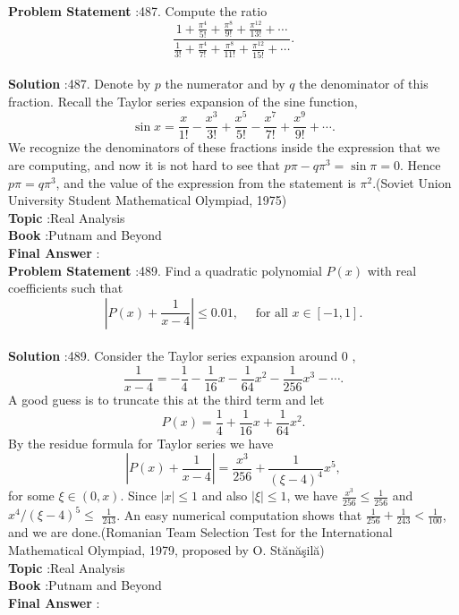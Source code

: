 \documentclass[10pt]{article}
\begin{document}
\textbf{Problem Statement} :487. Compute the ratio$$ \frac{1+\frac{\pi^{4}}{5 !}+\frac{\pi^{8}}{9 !}+\frac{\pi^{12}}{13 !}+\cdots}{\frac{1}{3 !}+\frac{\pi^{4}}{7 !}+\frac{\pi^{8}}{11 !}+\frac{\pi^{12}}{15 !}+\cdots} . $$\\
\textbf{Solution} :487. Denote by $p$ the numerator and by $q$ the denominator of this fraction. Recall the Taylor series expansion of the sine function,$$ \sin x=\frac{x}{1 !}-\frac{x^{3}}{3 !}+\frac{x^{5}}{5 !}-\frac{x^{7}}{7 !}+\frac{x^{9}}{9 !}+\cdots . $$We recognize the denominators of these fractions inside the expression that we are computing, and now it is not hard to see that $p \pi-q \pi^{3}=\sin \pi=0$. Hence $p \pi=q \pi^{3}$, and the value of the expression from the statement is $\pi^{2}$.(Soviet Union University Student Mathematical Olympiad, 1975) \\
\textbf{Topic} :Real Analysis\\
\textbf{Book} :Putnam and Beyond\\
\textbf{Final Answer} :\\


\textbf{Problem Statement} :489. Find a quadratic polynomial $P(x)$ with real coefficients such that$$ \left|P(x)+\frac{1}{x-4}\right| \leq 0.01, \quad \text { for all } x \in[-1,1] . $$\\
\textbf{Solution} :489. Consider the Taylor series expansion around 0 ,$$ \frac{1}{x-4}=-\frac{1}{4}-\frac{1}{16} x-\frac{1}{64} x^{2}-\frac{1}{256} x^{3}-\cdots . $$A good guess is to truncate this at the third term and let $$ P(x)=\frac{1}{4}+\frac{1}{16} x+\frac{1}{64} x^{2} . $$By the residue formula for Taylor series we have$$ \left|P(x)+\frac{1}{x-4}\right|=\frac{x^{3}}{256}+\frac{1}{(\xi-4)^{4}} x^{5}, $$for some $\xi \in(0, x)$. Since $|x| \leq 1$ and also $|\xi| \leq 1$, we have $\frac{x^{3}}{256} \leq \frac{1}{256}$ and $x^{4} /(\xi-4)^{5} \leq$ $\frac{1}{243}$. An easy numerical computation shows that $\frac{1}{256}+\frac{1}{243}<\frac{1}{100}$, and we are done.(Romanian Team Selection Test for the International Mathematical Olympiad, 1979, proposed by O. Stănăşilă)\\
\textbf{Topic} :Real Analysis\\
\textbf{Book} :Putnam and Beyond\\
\textbf{Final Answer} :\\
\end{document}
